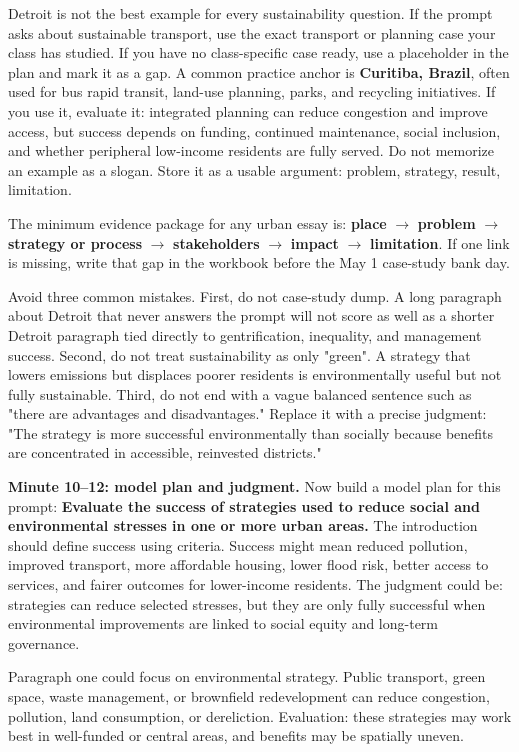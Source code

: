 \documentclass[11pt,a4paper]{article}
\newcommand{\term}[1]{\textcolor{HeadingBlue}{\textbf{#1}}}
\newcommand{\exam}[1]{\textcolor{AccentTeal}{\textbf{#1}}}
\begin{document}
Detroit is not the best example for every sustainability question. If the prompt
asks about sustainable transport, use the exact transport or planning case your
class has studied. If you have no class-specific case ready, use a placeholder
in the plan and mark it as a gap. A common practice anchor is \term{Curitiba,
Brazil}, often used for bus rapid transit, land-use planning, parks, and
recycling initiatives. If you use it, evaluate it: integrated planning can
reduce congestion and improve access, but success depends on funding, continued
maintenance, social inclusion, and whether peripheral low-income residents are
fully served. Do not memorize an example as a slogan. Store it as a usable
argument: problem, strategy, result, limitation.

The minimum evidence package for any urban essay is:
\term{place} $\rightarrow$ \term{problem} $\rightarrow$ \term{strategy or
process} $\rightarrow$ \term{stakeholders} $\rightarrow$ \term{impact}
$\rightarrow$ \term{limitation}. If one link is missing, write that gap in the
workbook before the May 1 case-study bank day.

Avoid three common mistakes. First, do not case-study dump. A long paragraph
about Detroit that never answers the prompt will not score as well as a shorter
Detroit paragraph tied directly to gentrification, inequality, and management
success. Second, do not treat sustainability as only "green". A strategy that
lowers emissions but displaces poorer residents is environmentally useful but
not fully sustainable. Third, do not end with a vague balanced sentence such as
"there are advantages and disadvantages." Replace it with a precise judgment:
"The strategy is more successful environmentally than socially because benefits
are concentrated in accessible, reinvested districts."

\textbf{Minute 10--12: model plan and judgment.}
Now build a model plan for this prompt: \exam{Evaluate the success of strategies
used to reduce social and environmental stresses in one or more urban areas.}
The introduction should define success using criteria. Success might mean
reduced pollution, improved transport, more affordable housing, lower flood
risk, better access to services, and fairer outcomes for lower-income
residents. The judgment could be: strategies can reduce selected stresses, but
they are only fully successful when environmental improvements are linked to
social equity and long-term governance.

Paragraph one could focus on environmental strategy. Public transport, green
space, waste management, or brownfield redevelopment can reduce congestion,
pollution, land consumption, or dereliction. Evaluation: these strategies may
work best in well-funded or central areas, and benefits may be spatially uneven.
\end{document}
